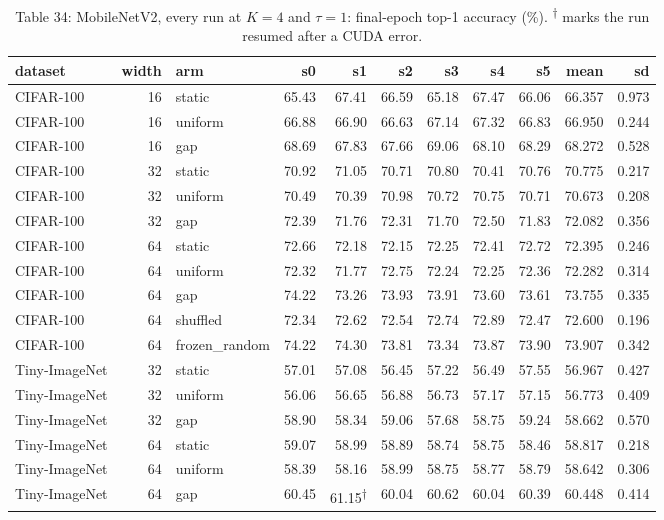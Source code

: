 \documentclass{article}
\begin{document}
\begin{table}
\caption{Table 34: MobileNetV2, every run at $K=4$ and $\tau=1$: final-epoch top-1
accuracy (\%). \textsuperscript{†} marks the run resumed after a CUDA
error.}

\begin{tabular}{l r l rrrrrr rr}
\toprule
dataset & width & arm & s0 & s1 & s2 & s3 & s4 & s5 & mean & sd \\
\midrule
CIFAR‑100 & 16 & static & 65.43 & 67.41 & 66.59 & 65.18 & 67.47 & 66.06 & 66.357 & 0.973 \\
CIFAR‑100 & 16 & uniform & 66.88 & 66.90 & 66.63 & 67.14 & 67.32 & 66.83 & 66.950 & 0.244 \\
CIFAR‑100 & 16 & gap & 68.69 & 67.83 & 67.66 & 69.06 & 68.10 & 68.29 & 68.272 & 0.528 \\
CIFAR‑100 & 32 & static & 70.92 & 71.05 & 70.71 & 70.80 & 70.41 & 70.76 & 70.775 & 0.217 \\
CIFAR‑100 & 32 & uniform & 70.49 & 70.39 & 70.98 & 70.72 & 70.75 & 70.71 & 70.673 & 0.208 \\
CIFAR‑100 & 32 & gap & 72.39 & 71.76 & 72.31 & 71.70 & 72.50 & 71.83 & 72.082 & 0.356 \\
CIFAR‑100 & 64 & static & 72.66 & 72.18 & 72.15 & 72.25 & 72.41 & 72.72 & 72.395 & 0.246 \\
CIFAR‑100 & 64 & uniform & 72.32 & 71.77 & 72.75 & 72.24 & 72.25 & 72.36 & 72.282 & 0.314 \\
CIFAR‑100 & 64 & gap & 74.22 & 73.26 & 73.93 & 73.91 & 73.60 & 73.61 & 73.755 & 0.335 \\
CIFAR‑100 & 64 & shuffled & 72.34 & 72.62 & 72.54 & 72.74 & 72.89 & 72.47 & 72.600 & 0.196 \\
CIFAR‑100 & 64 & frozen\_random & 74.22 & 74.30 & 73.81 & 73.34 & 73.87 & 73.90 & 73.907 & 0.342 \\
Tiny‑ImageNet & 32 & static & 57.01 & 57.08 & 56.45 & 57.22 & 56.49 & 57.55 & 56.967 & 0.427 \\
Tiny‑ImageNet & 32 & uniform & 56.06 & 56.65 & 56.88 & 56.73 & 57.17 & 57.15 & 56.773 & 0.409 \\
Tiny‑ImageNet & 32 & gap & 58.90 & 58.34 & 59.06 & 57.68 & 58.75 & 59.24 & 58.662 & 0.570 \\
Tiny‑ImageNet & 64 & static & 59.07 & 58.99 & 58.89 & 58.74 & 58.75 & 58.46 & 58.817 & 0.218 \\
Tiny‑ImageNet & 64 & uniform & 58.39 & 58.16 & 58.99 & 58.75 & 58.77 & 58.79 & 58.642 & 0.306 \\
Tiny‑ImageNet & 64 & gap & 60.45 & 61.15\textsuperscript{†} & 60.04 & 60.62 & 60.04 & 60.39 & 60.448 & 0.414 \\
\bottomrule
\end{tabular}
\end{table}
\end{document}
